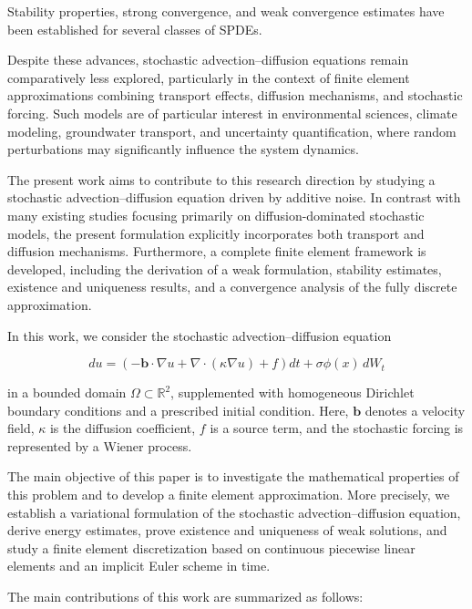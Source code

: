 Stability properties, strong convergence, and weak convergence estimates have been established for several
classes of SPDEs.

Despite these advances, stochastic advection--diffusion equations remain comparatively less explored, 
particularly in the context of finite element approximations combining transport effects, diffusion 
mechanisms, and stochastic forcing. Such models are of particular interest in environmental sciences, 
climate modeling, groundwater transport, and uncertainty quantification, where random perturbations may 
significantly influence the system dynamics.

The present work aims to contribute to this research direction by studying a stochastic advection--diffusion 
equation driven by additive noise. In contrast with many existing studies focusing primarily on 
diffusion-dominated stochastic models, the present formulation explicitly incorporates both transport 
and diffusion mechanisms. Furthermore, a complete finite element framework is developed, including the 
derivation of a weak formulation, stability estimates, existence and uniqueness results, and a convergence 
analysis of the fully discrete approximation.


In this work, we consider the stochastic advection--diffusion equation

\begin{equation}
du
=
\left(
-\mathbf b\cdot\nabla u
+
\nabla\cdot(\kappa\nabla u)
+
f
\right)dt
+
\sigma \phi(x)\,dW_t
\label{eq:intro_model}
\end{equation}


in a bounded domain $\Omega \subset \mathbb R^2$, supplemented with homogeneous Dirichlet boundary conditions and a prescribed initial condition. Here, $\mathbf b$ denotes a velocity field, $\kappa$ is the diffusion coefficient, $f$ is a source term, and the stochastic forcing is represented by a Wiener process.

The main objective of this paper is to investigate the mathematical properties of this problem and to develop a finite element approximation. More precisely, we establish a variational formulation of the stochastic advection--diffusion equation, derive energy estimates, prove existence and uniqueness of weak solutions, and study a finite element discretization based on continuous piecewise linear elements and an implicit Euler scheme in time.

The main contributions of this work are summarized as follows:

